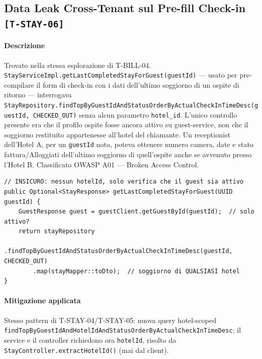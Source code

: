 ﻿\documentclass[a4paper,12pt]{report}
\newcommand{\threat}[1]{\texttt{\small\textcolor{vulnred}{[#1]}}}
\begin{document}
\subsection{Data Leak Cross-Tenant sul Pre-fill Check-in \threat{T-STAY-06}}

\paragraph{Descrizione}
Trovato nella stessa esplorazione di T-BILL-04. \texttt{StayServiceImpl.getLastCompletedStayForGuest(guestId)}
--- usato per pre-compilare il form di check-in con i dati dell'ultimo soggiorno di un
ospite di ritorno --- interrogava \texttt{StayRepository.findTopByGuestIdAndStatusOrderByActualCheckInTimeDesc(guestId,
CHECKED\_OUT)} senza alcun parametro \texttt{hotel\_id}. L'unico controllo presente era che
il profilo ospite fosse ancora attivo su guest-service, non che il soggiorno restituito
appartenesse all'hotel del chiamante. Un receptionist dell'Hotel A, per un
\texttt{guestId} noto, poteva ottenere numero camera, date e stato fattura/Alloggiati
dell'ultimo soggiorno di quell'ospite anche se avvenuto presso l'Hotel B. Classificato
OWASP A01 --- Broken Access Control.

\begin{insecurebox}[title={Codice Vulnerabile --- StayServiceImpl.java (baseline)}]
\begin{lstlisting}[style=java]
// INSICURO: nessun hotelId, solo verifica che il guest sia attivo
public Optional<StayResponse> getLastCompletedStayForGuest(UUID guestId) {
    GuestResponse guest = guestClient.getGuestById(guestId);  // solo attivo?
    return stayRepository
        .findTopByGuestIdAndStatusOrderByActualCheckInTimeDesc(guestId, CHECKED_OUT)
        .map(stayMapper::toDto);  // soggiorno di QUALSIASI hotel
}
\end{lstlisting}
\end{insecurebox}

\paragraph{Mitigazione applicata}
Stesso pattern di T-STAY-04/T-STAY-05: nuova query hotel-scoped
\texttt{findTopByGuestIdAndHotelIdAndStatusOrderByActualCheckInTimeDesc}; il service e il
controller richiedono ora \texttt{hotelId}, risolto da \texttt{StayController.extractHotelId()}
(mai dal client).
\end{document}
